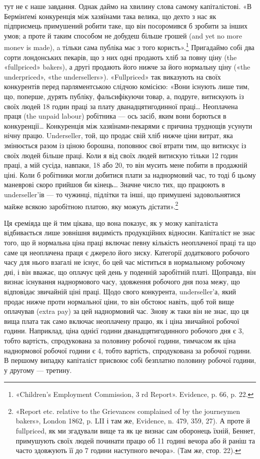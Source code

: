 тут не є наше завдання. Однак даймо на хвилину слова
самому капіталістові. «В Бермінґемі конкуренція між хазяїнами
така велика, що дехто з нас як підприємець примушений робити
таке, що він посоромився б зробити за інших умов; а проте й
таким способом не добудеш більше грошей (and yet no more
monev is made), a тільки сама публіка має з того користь».\footnote{
«Children’s Employment Commission, 3 rd Report». Evidence, p. 66, p. 22.
}
Пригадаймо собі два сорти лондонських пекарів, що з них одні
продають хліб за повну ціну (the «fullpriced» bakers), а другі
продають його нижче за його нормальну ціну («the underpriced»,
«the undersellers»). «Fullpriced» так виказують на своїх
конкурентів перед парляментською слідчою комісією: «Вони
існують лише тим, що, поперше, дурять публіку, фальсифікуючи
товар, а, подруге, витискують із своїх людей 18 годин праці
за плату дванадцятигодинної праці\dots{} Неоплачена праця (the
unpaid labour) робітника — ось засіб, яким вони борються в
конкуренції\dots{} Конкуренція між хазяїнами-пекарями є причина
труднощів усунути нічну працю. Underseller, той, що продає
свій хліб нижче ціни витрат, яка змінюється разом із ціною
борошна, поповнює свої втрати тим, що витискує із своїх людей
більше праці. Коли я від своїх людей витискую тільки 12 годин
праці, а мій сусіда, навпаки, 18 або 20, то він мусить мене побити
в продажній ціні. Коли б робітники могли добитися плати за
наднормовий час, то тоді б цьому маневрові скоро прийшов би
кінець\dots{} Значне число тих, що працюють в underseller’ів — то
чужинці, підлітки та інші, що примушені задовольнятися майже
всякою заробітною платою, яку можуть дістати».\footnote{
«Report etc. relative to the Grievances complained of by the
journeymen bakers», London 1862, p. LII і там же, Evidence, n. 479,
359, 27). А проте й fullpriced, як ми згадували вище та як це визнає сам
оборонець їхній, Беннет, примушують своїх людей починати працю об
11 годині вечора або й раніш та часто здовжують її до 7 години наступного
вечора». (Там же, стор. 22).
}

Ця єреміяда ще й тим цікава, що вона показує, як у мозку
капіталіста відбивається лише зовнішня видимість продукційних
відносин. Капіталіст не знає того, що й нормальна ціна праці
включає певну кількість неоплаченої праці та що саме ця неоплачена
праця є джерело його зиску. Категорії додаткового робочого
часу для нього взагалі не існує, бо цей час міститься в нормальному
робочому дні, і він вважає, що оплачує цей день у поденній
заробітній платі. Щоправда, він визнає існування наднормового
часу, здовження робочого дня поза межу, що відповідає звичайній
ціні праці. Щодо свого конкурента, underseller’а, який продає
нижче проти нормальної ціни, то він обстоює навіть, щоб той
вище оплачував (extra pay) за цей наднормовий час. Знову ж
таки він не знає, що ця вища плата так само включає неоплачену
працю, як і ціна звичайної робочої години. Наприклад,
ціна однієї години дванадцятигодинного робочого дня є 3,
тобто вартість, спродукована за половину робочої години, тимчасом
як ціна наднормової робочої години є 4, тобто вартість,
спродукована за  робочої години. В першому випадку капіталіст
присвоює собі безплатно половину робочої години, у
другому — третину.

